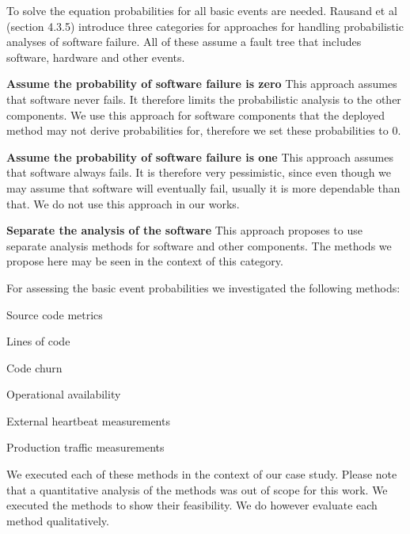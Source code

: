 \clearpage

To solve the equation probabilities for all basic events are needed. Rausand et al~\cite{SysReliabilityTheory} (section 4.3.5) introduce three categories for approaches for handling probabilistic analyses of software failure. All of these assume a fault tree that includes software, hardware and other events.
\begin{tenumerate}
  \item \textbf{Assume the probability of software failure is zero} This approach assumes that software never fails. It therefore limits the probabilistic analysis to the other components. We use this approach for software components that the deployed method may not derive probabilities for, therefore we set these probabilities to 0.
  \item \textbf{Assume the probability of software failure is one} This approach assumes that software always fails. It is therefore very pessimistic, since even though we may assume that software will eventually fail, usually it is more dependable than that. We do not use this approach in our works.
  \item \textbf{Separate the analysis of the software} This approach proposes to use separate analysis methods for software and other components. The methods we propose here may be seen in the context of this category.
\end{tenumerate}

For assessing the basic event probabilities we investigated the following methods:
\begin{tenumerate}
  \item Source code metrics
  \begin{tenumerate}
    \item Lines of code
    \item Code churn
  \end{tenumerate}
  \item Operational availability
  \begin{tenumerate}
    \item External heartbeat measurements
    \item Production traffic measurements
  \end{tenumerate}
\end{tenumerate}

We executed each of these methods in the context of our case study. Please note that a quantitative analysis of the methods was out of scope for this work. We executed the methods to show their feasibility. We do however evaluate each method qualitatively.

